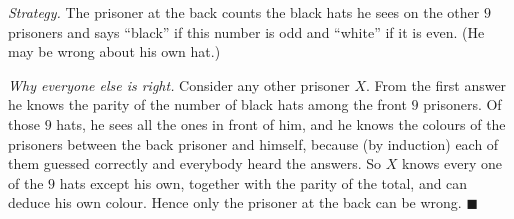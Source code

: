 \emph{Strategy.} The prisoner at the back counts the black hats he sees on the other $9$ prisoners and says ``black'' if this number is odd and ``white'' if it is even. (He may be wrong about his own hat.)

\emph{Why everyone else is right.} Consider any other prisoner $X$. From the first answer he knows the parity of the number of black hats among the front $9$ prisoners. Of those $9$ hats, he sees all the ones in front of him, and he knows the colours of the prisoners between the back prisoner and himself, because (by induction) each of them guessed correctly and everybody heard the answers. So $X$ knows every one of the $9$ hats except his own, together with the parity of the total, and can deduce his own colour. Hence only the prisoner at the back can be wrong. $\blacksquare$
